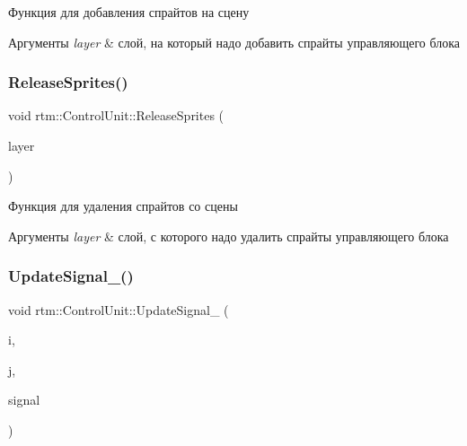 Функция для добавления спрайтов на сцену 
\begin{DoxyParams}{Аргументы}
{\em layer} & слой, на который надо добавить спрайты управляющего блока \\
\hline
\end{DoxyParams}
\mbox{\label{classrtm_1_1_control_unit_ac21d7c91d9c62fb58f29b2412ce4d4be}} 
\subsubsection{\texorpdfstring{Release\+Sprites()}{ReleaseSprites()}}
{\footnotesize\ttfamily void rtm\+::\+Control\+Unit\+::\+Release\+Sprites (\begin{DoxyParamCaption}\item[{cocos2d\+::\+Layer $\ast$const}]{layer }\end{DoxyParamCaption})}

Функция для удаления спрайтов со сцены 
\begin{DoxyParams}{Аргументы}
{\em layer} & слой, с которого надо удалить спрайты управляющего блока \\
\hline
\end{DoxyParams}
\mbox{\label{classrtm_1_1_control_unit_afacb521a6f7297b932a48edbbf0a10b2}} 
\subsubsection{\texorpdfstring{Update\+Signal\+\_\+()}{UpdateSignal\_()}}
{\footnotesize\ttfamily void rtm\+::\+Control\+Unit\+::\+Update\+Signal\+\_\+ (\begin{DoxyParamCaption}\item[{size\+\_\+t}]{i,  }\item[{size\+\_\+t}]{j,  }\item[{\hyperlink{namespacertm_aadb7300c15d57429546fb0b7f8ee0ee6}{Signal\+Type}}]{signal }\end{DoxyParamCaption})\hspace{0.3cm}{\ttfamily [private]}}

